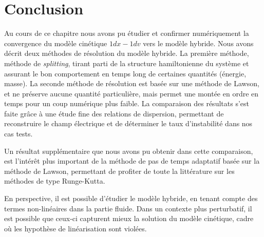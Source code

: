 
\section{Conclusion}

Au cours de ce chapitre nous avons pu étudier et confirmer numériquement la convergence du modèle cinétique $1dx-1dv$ vers le modèle hybride. Nous avons décrit deux méthodes de résolution du modèle hybride. La première méthode, méthode de \emph{splitting}, tirant parti de la structure hamiltonienne du système et assurant le bon comportement en temps long de certaines quantités (énergie, masse). La seconde méthode de résolution est basée sur une méthode de Lawson, et ne préserve aucune quantité particulière, mais permet une montée en ordre en temps pour un coup numérique plus faible. La comparaison des résultats s'est faite grâce à une étude fine des relations de dispersion, permettant de reconstruire le champ électrique et de déterminer le taux d'instabilité dans nos cas tests.

Un résultat supplémentaire que nous avons pu obtenir dans cette comparaison, est l'intérêt plus important de la méthode de pas de temps adaptatif basée sur la méthode de Lawson, permettant de profiter de toute la littérature sur les méthodes de type Runge-Kutta.

En perspective, il est possible d'étudier le modèle hybride, en tenant compte des termes non-linéaires dans la partie fluide. Dans un contexte plus perturbatif, il est possible que ceux-ci capturent mieux la solution du modèle cinétique, cadre où les hypothèse de linéarisation sont violées. 

